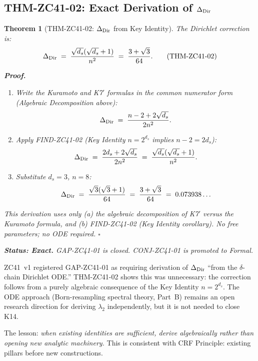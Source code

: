\documentclass[12pt, a4paper]{article}
\newtheorem{theorem}{Theorem}[section]
\begin{document}
\subsection{THM-ZC41-02: Exact Derivation of \texorpdfstring{$\Delta_{\rm Dir}$}{Dir}}
\label{sec:thm2}

\begin{theorem}[THM-ZC41-02: $\Delta_{\rm Dir}$ from Key Identity]
\label{thm:deltadir}
The Dirichlet correction is:
\[
  \Delta_{\rm Dir}
  \;=\; \frac{\sqrt{d_s}(\sqrt{d_s}+1)}{n^2}
  \;=\; \frac{3+\sqrt{3}}{64}.
  \tag{THM-ZC41-02}
\]

\noindent\textbf{Proof.}
\begin{enumerate}[leftmargin=2em]
  \item Write the Kuramoto and K7$'$ formulas in the common
    numerator form (Algebraic Decomposition above):
    \[
      \Delta_{\rm Dir}
      \;=\; \frac{n - 2 + 2\sqrt{d_s}}{2n^2}.
    \]

  \item Apply FIND-ZC41-02 (Key Identity $n = 2^{d_s}$ implies
    $n - 2 = 2d_s$):
    \[
      \Delta_{\rm Dir}
      \;=\; \frac{2d_s + 2\sqrt{d_s}}{2n^2}
      \;=\; \frac{\sqrt{d_s}(\sqrt{d_s}+1)}{n^2}.
    \]

  \item Substitute $d_s = 3$, $n = 8$:
    \[
      \Delta_{\rm Dir}
      \;=\; \frac{\sqrt{3}(\sqrt{3}+1)}{64}
      \;=\; \frac{3+\sqrt{3}}{64}
      \;=\; 0.073938\ldots
    \]
\end{enumerate}
This derivation uses only (a) the algebraic decomposition of K7$'$
versus the Kuramoto formula, and (b) FIND-ZC41-02 (Key Identity
corollary).
No free parameters; no ODE required.
\hfill$\square$

\medskip
\noindent\textbf{Status: Exact.}
GAP-ZC41-01 is closed.
CONJ-ZC41-01 is promoted to Formal.
\end{theorem}

\begin{keybox}[title={Why No ODE Was Needed}]
ZC41~v1 registered GAP-ZC41-01 as requiring derivation of
$\Delta_{\rm Dir}$ ``from the $\delta$-chain Dirichlet ODE.''
THM-ZC41-02 shows this was unnecessary: the correction follows
from a purely algebraic consequence of the Key Identity
$n = 2^{d_s}$.
The ODE approach (Born-resampling spectral theory, Part~B) remains
an open research direction for deriving $\lambda_2$ independently,
but it is not needed to close K14.

The lesson: \emph{when existing identities are sufficient,
derive algebraically rather than opening new analytic machinery.}
This is consistent with CRF Principle: existing pillars before
new constructions.
\end{keybox}
\end{document}
